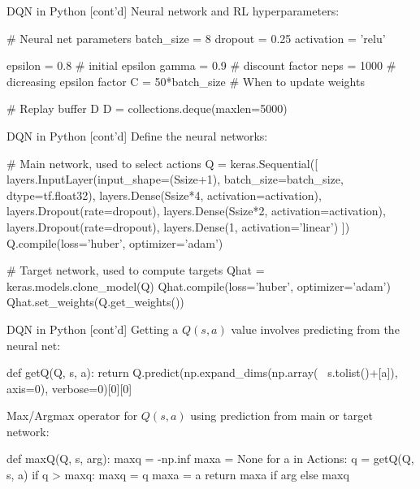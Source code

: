 \documentclass[ignorenonframetext,xcolor=x11names]{beamer}
\begin{document}
\begin{frame}[label=withcode,fragile]{DQN in Python \small [cont'd]}
Neural network and RL hyperparameters:
\begin{pythoncode}
# Neural net parameters
batch_size = 8
dropout = 0.25
activation = 'relu'

epsilon = 0.8 # initial epsilon
gamma = 0.9 # discount factor
neps = 1000 # dicreasing epsilon factor
C = 50*batch_size # When to update weights

# Replay buffer D
D = collections.deque(maxlen=5000)
\end{pythoncode}
\end{frame}

\begin{frame}[label=withcode,fragile]{DQN in Python \small [cont'd]}
Define the neural networks:
\begin{pythoncode}
# Main network, used to select actions
Q = keras.Sequential([
    layers.InputLayer(input_shape=(Ssize+1),
                      batch_size=batch_size,
                      dtype=tf.float32),
    layers.Dense(Ssize*4, activation=activation),
    layers.Dropout(rate=dropout),
    layers.Dense(Ssize*2, activation=activation),
    layers.Dropout(rate=dropout),
    layers.Dense(1, activation='linear')
])
Q.compile(loss='huber', optimizer='adam')

# Target network, used to compute targets
Qhat = keras.models.clone_model(Q)
Qhat.compile(loss='huber', optimizer='adam')
Qhat.set_weights(Q.get_weights())
\end{pythoncode}
\end{frame}

\begin{frame}[label=withcode,fragile]{DQN in Python \small [cont'd]}
Getting a $Q(s, a)$ value involves predicting from the neural net:
\begin{pythoncode}
def getQ(Q, s, a):
    return Q.predict(np.expand_dims(np.array( \
        s.tolist()+[a]), axis=0), verbose=0)[0][0]
\end{pythoncode}
Max/Argmax operator for $Q(s, a)$ using prediction from main or target network:
\begin{pythoncode}
def maxQ(Q, s, arg):
    maxq = -np.inf
    maxa = None
    for a in Actions:
        q = getQ(Q, s, a)
        if q > maxq:
            maxq = q
            maxa = a
    return maxa if arg else maxq
\end{pythoncode}
\end{frame}
\end{document}
